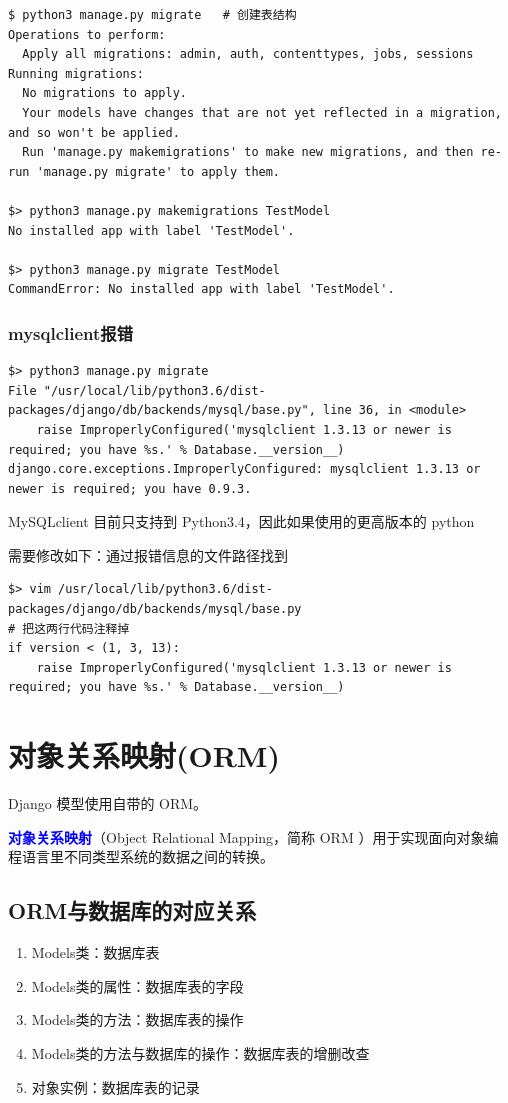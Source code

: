 \begin{lstlisting}[style=demostyle,numbers=none]
$ python3 manage.py migrate   # 创建表结构
Operations to perform:
  Apply all migrations: admin, auth, contenttypes, jobs, sessions
Running migrations:
  No migrations to apply.
  Your models have changes that are not yet reflected in a migration, and so won't be applied.
  Run 'manage.py makemigrations' to make new migrations, and then re-run 'manage.py migrate' to apply them.

$> python3 manage.py makemigrations TestModel
No installed app with label 'TestModel'.

$> python3 manage.py migrate TestModel
CommandError: No installed app with label 'TestModel'.  
\end{lstlisting}

\subsubsection{mysqlclient报错}
\begin{lstlisting}[style=demostyle,numbers=none]
$> python3 manage.py migrate
File "/usr/local/lib/python3.6/dist-packages/django/db/backends/mysql/base.py", line 36, in <module>
    raise ImproperlyConfigured('mysqlclient 1.3.13 or newer is required; you have %s.' % Database.__version__)
django.core.exceptions.ImproperlyConfigured: mysqlclient 1.3.13 or newer is required; you have 0.9.3.
\end{lstlisting}


MySQLclient 目前只支持到 Python3.4，因此如果使用的更高版本的 python

需要修改如下：通过报错信息的文件路径找到
\begin{lstlisting}[style=demostyle,numbers=none]
$> vim /usr/local/lib/python3.6/dist-packages/django/db/backends/mysql/base.py
# 把这两行代码注释掉
if version < (1, 3, 13):
    raise ImproperlyConfigured('mysqlclient 1.3.13 or newer is required; you have %s.' % Database.__version__)
\end{lstlisting}


\section{对象关系映射(ORM)}
Django 模型使用自带的 ORM。

\textcolor{blue}{\textbf{对象关系映射}}（Object Relational Mapping，简称 ORM ）用于实现面向对象编程语言里不同类型系统的数据之间的转换。

\subsection{ORM与数据库的对应关系}
\begin{enumerate}[label=\arabic*)]
    \item Models类：数据库表
    \item Models类的属性：数据库表的字段
    \item Models类的方法：数据库表的操作
    \item Models类的方法与数据库的操作：数据库表的增删改查
    \item 对象实例：数据库表的记录
\end{enumerate}

